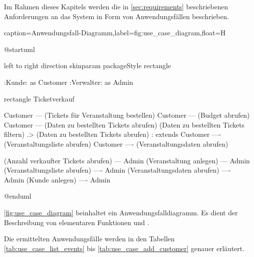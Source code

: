 Im Rahmen dieses Kapitels werden die in \autoref{sec:requirements} beschriebenen Anforderungen an das System in Form von Anwendungsfällen beschrieben. 

\begin{dhbwfigure}{caption=Anwendungsfall-Diagramm,label=fig:use_case_diagram,float=H}
    \begin{plantuml}
        @startuml

            left to right direction
            skinparam packageStyle rectangle

            :Kunde: as Customer
            :Verwalter: as Admin

            rectangle Ticketverkauf {
                Customer --- (Tickets für Veranstaltung bestellen)
                Customer --- (Budget abrufen)
                Customer --- (Daten zu bestellten Tickets abrufen)
                (Daten zu bestellten Tickets filtern) .> (Daten zu bestellten Tickets abrufen) : extends
                Customer ---- (Veranstaltungsliste abrufen)
                Customer ---- (Veranstaltungsdaten abrufen)

                (Anzahl verkaufter Tickets abrufen) --- Admin
                (Veranstaltung anlegen) --- Admin
                (Veranstaltungsliste abrufen) ---- Admin
                (Veranstaltungsdaten abrufen) ---- Admin
                (Kunde anlegen) ---- Admin
            }
        @enduml
    \end{plantuml}
\end{dhbwfigure}

\autoref{fig:use_case_diagram} beinhaltet ein Anwendungsfalldiagramm.
Es dient der Beschreibung von elementaren Funktionen und .

Die ermittelten Anwendungsfälle werden in den Tabellen \ref{tab:use_case_list_events} bis \ref{tab:use_case_add_customer} genauer erläutert.
